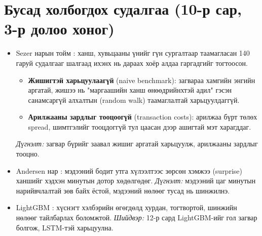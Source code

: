 \section{Бусад холбогдох судалгаа (10-р сар, 3-р долоо хоног)}
\begin{itemize}
	\item Sezer нарын тойм \cite{sezer2020financial}: ханш, хувьцааны үнийг гүн сургалтаар таамагласан 140 гаруй
	судалгааг шалгаад ихэнх нь дараах хоёр алдаа гаргадгийг тогтоосон.
	\begin{itemize}
		\item \textbf{Жишигтэй харьцуулаагүй} (naive benchmark): загвараа хамгийн энгийн аргатай, жишээ нь
		"маргаашийн ханш өнөөдрийнхтэй адил" гэсэн санамсаргүй алхалтын (random walk) таамаглалтай
		харьцуулдаггүй.
		\item \textbf{Арилжааны зардлыг тооцоогүй} (transaction costs): арилжаа бүрт төлөх spread, шимтгэлийг
		тооцдоггүй тул цаасан дээр ашигтай мэт харагддаг.
	\end{itemize}
	\emph{Дүгнэлт:} загвар бүрийг заавал жишиг аргатай харьцуулж, арилжааны зардлыг тооцно.
	\item Andersen нар \cite{andersen2003micro}: мэдээний бодит утга хүлээлтээс зөрсөн хэмжээ (surprise) ханшийг
	хэдхэн минутын дотор хөдөлгөдөг. \emph{Дүгнэлт:} мэдээний цаг минутын нарийвчлалтай зөв байх ёстой, мэдээний
	нөлөөг тусад нь шинжилнэ.
	\item LightGBM \cite{ke2017lightgbm}: хүснэгт хэлбэрийн өгөгдөлд хурдан, тогтвортой, шинжийн нөлөөг тайлбарлах
	боломжтой. \emph{Шийдвэр:} 12-р сард LightGBM-ийг гол загвар болгож, LSTM-тэй харьцуулна.
\end{itemize}
